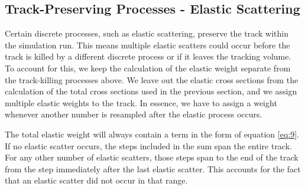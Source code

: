 \documentclass[12pt]{article}
\begin{document}


\subsection{Track-Preserving Processes - Elastic Scattering}
Certain discrete processes, such as elastic scattering, preserve the track within the simulation run. This means multiple elastic scatters could occur before the track is killed by a different discrete process or if it leaves the tracking volume. To account for this, we keep the calculation of the elastic weight separate from the track-killing processes above. We leave out the elastic cross sections from the calculation of the total cross sections used in the previous section, and we assign multiple elastic weights to the track. In essence, we have to assign a weight whenever another number is resampled after the elastic process occurs. 

The total elastic weight will always contain a term in the form of equation \ref{eq:9}. If no elastic scatter occurs, the steps included in the sum span the entire track. For any other number of elastic scatters, those steps span to the end of the track from the step immediately after the last elastic scatter. This accounts for the fact that an elastic scatter did not occur in that range. 
\end{document}
